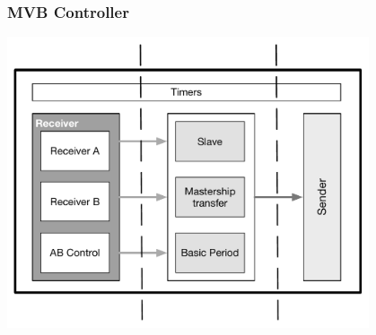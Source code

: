 \documentclass[12pt,beamer]{beamer}
\begin{document}
\begin{frame}
\frametitle{MVB Controller}
\begin{center}
	\includegraphics[width=0.8\textwidth]{pic/Module_Division.pdf}	
\end{center}
\end{frame}
\end{document}
